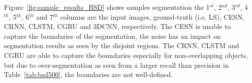 \documentclass{WitsPhysicsReport}
\begin{document}
 
\begin{table}[H]
\centering
\caption{BSD testing results. Here we compare various models and noise is also included.}
    \label{tab:bsd500}
\end{table}

Figure~\ref{fig:sample_results_BSD} shows samples segmentation the 1$^{st}$, 2$^{nd}$, 3$^{rd}$, 4$^{th}$, 5$^{th}$, 6$^{th}$ and 7$^{th}$ columns are the input images, ground-truth (i.e. LS), CESN, CRNN, CLSTM, CGRU and 3DCNN, respectively. The CESN is unable to capture the boundaries of the segmentation, the noise has an impact on segmentation results as seen by the disjoint regions. The CRNN, CLSTM and CGRU are able to capture the boundaries especially for non-overlapping objects, but due to over-segmentation as seen from a larger recall than precision in Table~\ref{tab:bsd500}, the boundaries are not well-defined.

\end{document}
